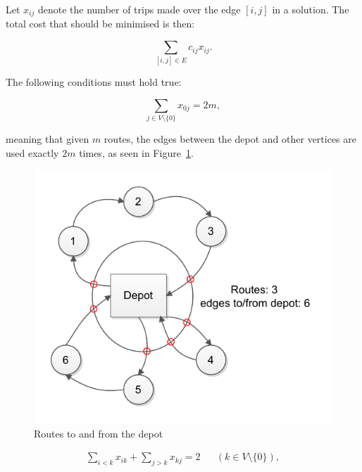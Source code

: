 Let $x_{ij}$ denote the number of trips made over the edge $[i, j]$ in a solution. The total cost that should be minimised is then:

\begin{equation}
\label{eq:baseformula1}
\displaystyle \sum_{[i,j] \in E} c_{ij}x_{ij}.
\end{equation}

\noindent
The following conditions must hold true:

\begin{equation}
\label{eq:baseformula2}
\displaystyle \sum_{j \in V \setminus\{0\}} x_{0j} = 2m,
\end{equation}

\noindent
meaning that given $m$ routes, the edges between the depot and other vertices are used exactly $2m$ times, as seen in Figure~\ref{fig:basecond1}. \cite{laporte2007you}
\begin{figure}[h]
  \begin{center}
    \includegraphics{images/basecond1.pdf}
    \caption{Routes to and from the depot}
    \label{fig:basecond1}
  \end{center}
\end{figure}

\begin{equation}
\begin{aligned}
\label{eq:baseformula3}
\displaystyle\sum_{i < k} x_{ik} + \displaystyle\sum_{j > k} x_{kj} = 2 && (k \in V \setminus\{0\}),
\end{aligned}
\end{equation}

